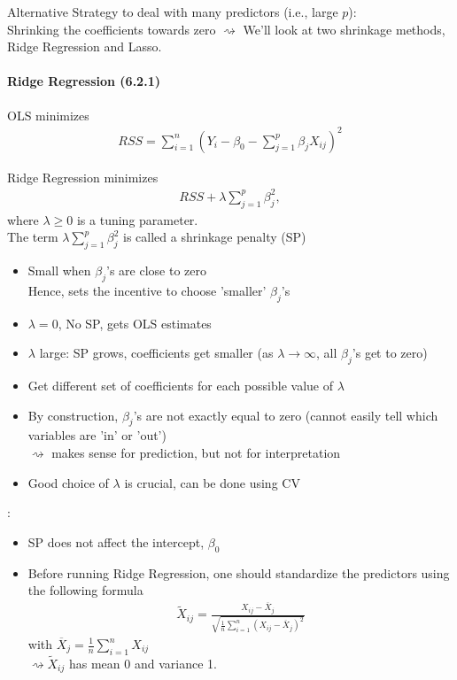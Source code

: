 \documentclass[11pt,a4paper,numbers=endperiod]{scrartcl}
\newcommand{\tit}[1]{\begin{large} \underline{\text{#1}}\end{large}}
\begin{document}
{Alternative Strategy to deal with many predictors (i.e., large $p$):\\
Shrinking the coefficients towards zero $\rightsquigarrow$ We'll look at two shrinkage methods, Ridge Regression and Lasso.\\

\paragraph{Ridge Regression (6.2.1)}
$ $\\

OLS minimizes \begin{align*}
	RSS = \sum\limits_{i = 1}^n (Y_i - \beta_0 - \sum\limits_{j = 1}^p \beta_j X_{ij})^2
\end{align*}

Ridge Regression minimizes \begin{align*}
	 RSS + \lambda \sum_{j = 1}^p \beta_j^2,
\end{align*}
where $\lambda \geq 0$ is a tuning parameter.\\
The term $\lambda \sum\limits_{j = 1}^p \beta_j^2$ is  called a shrinkage penalty (SP)
\begin{itemize}
	\item Small when $\beta_j$'s are close to zero\\
	 Hence, sets the incentive to choose 'smaller' $\beta_j$'s
	\item $\lambda = 0$, No SP, gets OLS estimates
	\item $\lambda$ large: SP grows, coefficients get smaller (as $\lambda \rightarrow \infty$, all $\beta_j$'s get to zero)
	\item Get different set of coefficients for each possible value of $\lambda$
	\item By construction, $\beta_j$'s are not exactly equal to zero (cannot easily tell which variables are 'in' or 'out')\\
	$\rightsquigarrow$ makes sense for prediction, but not for interpretation
	\item Good choice of $\lambda$ is crucial, can be done using CV
\end{itemize}

\tit{Implementation}: 
\begin{itemize}
	\item SP does not affect the intercept, $\beta_0$\\
	\item Before running Ridge Regression, one should standardize the predictors using the following formula \begin{align*}
		\widetilde{X}_{ij} = \frac{X_{ij} - \overline{X}_j}{\sqrt{\frac{1}{n} \sum\limits_{i = 1}^n (X_{ij} - \overline{X}_j)^2}}
	\end{align*}
	with $\overline{X}_j = \frac{1}{n} \sum\limits_{i = 1}^n X_{ij}$\\
	$\rightsquigarrow \widetilde{X}_{ij}$ has mean 0 and variance 1.
\end{itemize}

}
\end{document}
